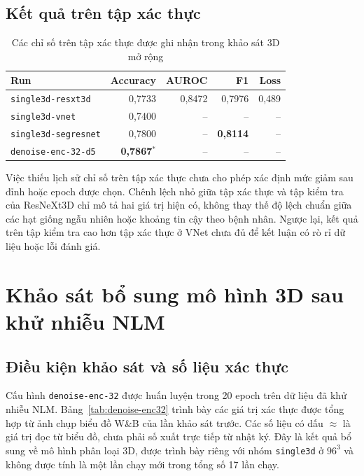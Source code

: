 \documentclass[14pt,a4paper,oneside]{extreport}
\begin{document}
\subsection{Kết quả trên tập xác thực}
\begin{table}[htbp]
  \centering
  \caption{Các chỉ số trên tập xác thực được ghi nhận trong khảo sát 3D mở rộng}
  \label{tab:sweep-3d-val}
  \setlength{\tabcolsep}{5pt}
  \begin{tabular}{@{}lrrrr@{}}
    \toprule Run & Accuracy & AUROC & F1 & Loss\\ \midrule
    \texttt{single3d-resxt3d} & 0,7733 & 0,8472 & 0,7976 & 0,489\\
    \texttt{single3d-vnet} & 0,7400 & -- & -- & --\\
    \texttt{single3d-segresnet} & 0,7800 & -- & \textbf{0,8114} & --\\
    \texttt{denoise-enc-32-d5} & \textbf{0,7867}$^{*}$ & -- & -- & --\\
    \bottomrule
  \end{tabular}
  \par{}
\end{table}
Việc thiếu lịch sử chỉ số trên tập xác thực chưa cho phép xác định mức
giảm sau đỉnh hoặc epoch được chọn. Chênh lệch nhỏ giữa tập xác thực và
tập kiểm tra của ResNeXt3D chỉ mô tả hai giá trị hiện có, không thay thế
độ lệch chuẩn giữa các hạt giống ngẫu nhiên hoặc khoảng tin cậy theo bệnh nhân.
Ngược lại, kết quả trên tập kiểm tra cao hơn tập xác thực ở VNet chưa đủ
để kết luận có rò rỉ dữ liệu hoặc lỗi đánh giá.
\FloatBarrier

\section{Khảo sát bổ sung mô hình 3D sau khử nhiễu NLM}
\label{sec:sweep-3d-denoise-enc32}
\subsection{Điều kiện khảo sát và số liệu xác thực}
Cấu hình \texttt{denoise-enc-32} được huấn luyện trong 20 epoch trên
dữ liệu đã khử nhiễu NLM. Bảng~\ref{tab:denoise-enc32} trình bày các giá
trị xác thực được tổng hợp từ ảnh chụp biểu đồ W\&B của lần khảo sát
trước. Các số liệu có dấu $\approx$ là giá trị đọc từ biểu đồ, chưa
phải số xuất trực tiếp từ nhật ký. Đây là kết quả bổ sung về mô hình
phân loại 3D, được trình bày riêng với nhóm \texttt{single3d} ở
$96^3$ và không được tính là một lần chạy mới trong tổng số 17 lần chạy.
\end{document}
